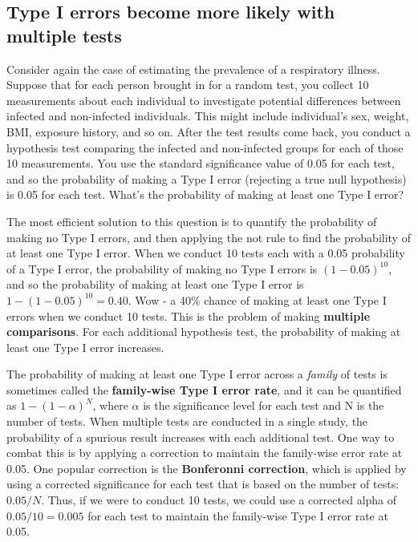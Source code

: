 \documentclass[
]{book}
\begin{document}
\subsection{Type I errors become more likely with multiple tests}\label{type-i-errors-become-more-likely-with-multiple-tests}

Consider again the case of estimating the prevalence of a respiratory illness. Suppose that for each person brought in for a random test, you collect 10 measurements about each individual to investigate potential differences between infected and non-infected individuals. This might include individual's sex, weight, BMI, exposure history, and so on. After the test results come back, you conduct a hypothesis test comparing the infected and non-infected groups for each of those 10 measurements. You use the standard significance value of 0.05 for each test, and so the probability of making a Type I error (rejecting a true null hypothesis) is 0.05 for each test. What's the probability of making at least one Type I error?

The most efficient solution to this question is to quantify the probability of making no Type I errors, and then applying the not rule to find the probability of at least one Type I error. When we conduct 10 tests each with a 0.05 probability of a Type I error, the probability of making no Type I errors is \((1-0.05)^{10}\), and so the probability of making at least one Type I error is \(1 - (1-0.05)^{10}=0.40\). Wow - a 40\% chance of making at least one Type I errors when we conduct 10 tests. This is the problem of making \textbf{multiple comparisons}. For each additional hypothesis test, the probability of making at least one Type I error increases.

The probability of making at least one Type I error across a \emph{family} of tests is sometimes called the \textbf{family-wise Type I error rate}, and it can be quantified as \(1-(1 - \alpha)^N\), where \(\alpha\) is the significance level for each test and N is the number of tests. When multiple tests are conducted in a single study, the probability of a spurious result increases with each additional test. One way to combat this is by applying a correction to maintain the family-wise error rate at 0.05. One popular correction is the \textbf{Bonferonni correction}, which is applied by using a corrected significance for each test that is based on the number of tests: \(0.05/N\). Thus, if we were to conduct 10 tests, we could use a corrected alpha of \(0.05/10=0.005\) for each test to maintain the family-wise Type I error rate at 0.05.
\end{document}
